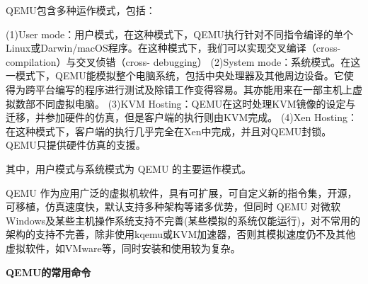 QEMU包含多种运作模式，包括：

(1)User mode：用户模式，在这种模式下，QEMU执行针对不同指令编译的单个Linux或Darwin/macOS程序。在这种模式下，我们可以实现交叉编译（cross-compilation）与交叉侦错（cross- debugging）
(2)System mode：系统模式。在这一模式下，QEMU能模拟整个电脑系统，包括中央处理器及其他周边设备。它使得为跨平台编写的程序进行测试及除错工作变得容易。其亦能用来在一部主机上虚拟数部不同虚拟电脑。
(3)KVM Hosting：QEMU在这时处理KVM镜像的设定与迁移，并参加硬件的仿真，但是客户端的执行则由KVM完成。
(4)Xen Hosting：在这种模式下，客户端的执行几乎完全在Xen中完成，并且对QEMU封锁。 QEMU只提供硬件仿真的支援。

其中，用户模式与系统模式为 QEMU 的主要运作模式。

QEMU 作为应用广泛的虚拟机软件，具有可扩展，可自定义新的指令集，开源，可移植，仿真速度快，默认支持多种架构等诸多优势，但同时 QEMU 对微软Windows及某些主机操作系统支持不完善(某些模拟的系统仅能运行)，对不常用的架构的支持不完善，除非使用kqemu或KVM加速器，否则其模拟速度仍不及其他虚拟软件，如VMware等，同时安装和使用较为复杂。

\textbf{QEMU的常用命令}

